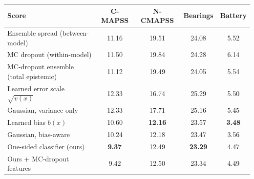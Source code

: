 \begin{tabular}{lcccc}
\toprule
Score & C-MAPSS & N-CMAPSS & Bearings & Battery \\
\midrule
Ensemble spread (between-model) & 11.16 & 19.51 & 24.08 & 5.52 \\
MC dropout (within-model) & 11.50 & 19.84 & 24.28 & 6.14 \\
MC-dropout ensemble (total epistemic) & 11.12 & 19.49 & 24.05 & 5.54 \\
Learned error scale $\sqrt{v(x)}$ & 12.33 & 16.74 & 25.29 & 5.50 \\
Gaussian, variance only & 12.33 & 17.71 & 25.16 & 5.45 \\
Learned bias $b(x)$ & 10.60 & \textbf{12.16} & 23.57 & \textbf{3.48} \\
Gaussian, bias-aware & 10.24 & 12.18 & 23.47 & 3.56 \\
One-sided classifier (ours) & \textbf{9.37} & 12.49 & \textbf{23.29} & 4.47 \\
Ours + MC-dropout features & 9.42 & 12.50 & 23.34 & 4.49 \\
\bottomrule
\end{tabular}
